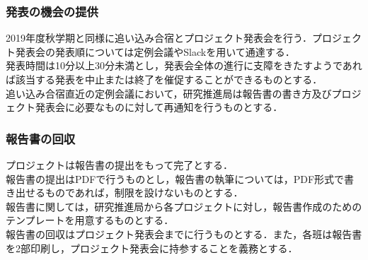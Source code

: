 \subsubsection*{発表の機会の提供}2019年度秋学期と同様に追い込み合宿とプロジェクト発表会を行う．プロジェクト発表会の発表順については定例会議やSlackを用いて通達する．\\発表時間は10分以上30分未満とし，発表会全体の進行に支障をきたすようであれば該当する発表を中止または終了を催促することができるものとする．\\追い込み合宿直近の定例会議において，研究推進局は報告書の書き方及びプロジェクト発表会に必要なものに対して再通知を行うものとする．

\subsubsection*{報告書の回収}プロジェクトは報告書の提出をもって完了とする．\\報告書の提出はPDFで行うものとし，報告書の執筆については，PDF形式で書き出せるものであれば，制限を設けないものとする．\\報告書に関しては，研究推進局から各プロジェクトに対し，報告書作成のためのテンプレートを用意するものとする．\\報告書の回収はプロジェクト発表会までに行うものとする．また，各班は報告書を2部印刷し，プロジェクト発表会に持参することを義務とする．\\


